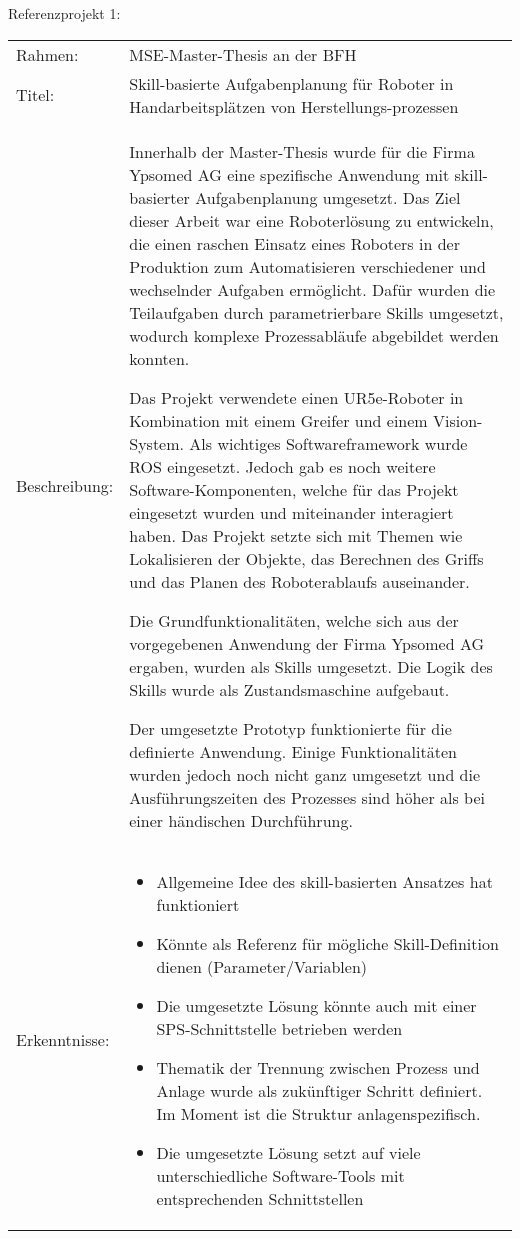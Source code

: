 	Referenzprojekt 1:
	\vspace{2mm}
	\\
	\begin{tabularx}{\textwidth}{@{}>{}p{8em} X@{}}
		Rahmen: & 
		MSE-Master-Thesis an der BFH
		\\
		
		Titel: & 
		Skill-basierte Aufgabenplanung für Roboter in Handarbeitsplätzen von Herstellungs-prozessen 
		\\
		
		Beschreibung: & 
		Innerhalb der Master-Thesis wurde für die Firma Ypsomed AG eine spezifische Anwendung mit skill-basierter Aufgabenplanung umgesetzt. Das Ziel dieser Arbeit war eine Roboterlösung zu entwickeln, die einen raschen Einsatz eines Roboters in der Produktion zum Automatisieren verschiedener und wechselnder Aufgaben ermöglicht. Dafür wurden die Teilaufgaben durch parametrierbare Skills umgesetzt, wodurch komplexe Prozessabläufe abgebildet werden konnten.
		
		Das Projekt verwendete einen UR5e-Roboter in Kombination mit einem Greifer und einem Vision-System. Als wichtiges Softwareframework wurde ROS eingesetzt. Jedoch gab es noch weitere Software-Komponenten, welche für das Projekt eingesetzt wurden und miteinander interagiert haben. Das Projekt setzte sich mit Themen wie Lokalisieren der Objekte, das Berechnen des Griffs und das Planen des Roboterablaufs auseinander.
		
		Die Grundfunktionalitäten, welche sich aus der vorgegebenen Anwendung der Firma Ypsomed AG ergaben, wurden als Skills umgesetzt. Die Logik des Skills wurde als Zustandsmaschine aufgebaut. 
		
		Der umgesetzte Prototyp funktionierte für die definierte Anwendung. Einige Funktionalitäten wurden jedoch noch nicht ganz umgesetzt und die Ausführungszeiten des Prozesses sind höher als bei einer händischen Durchführung. 
		\\
		
		Erkenntnisse: & 
		\begin{itemize}
			\item Allgemeine Idee des skill-basierten Ansatzes hat funktioniert
			\item Könnte als Referenz für mögliche Skill-Definition dienen (Parameter/Variablen)
			\item Die umgesetzte Lösung könnte auch mit einer SPS-Schnittstelle betrieben werden
			\item Thematik der Trennung zwischen Prozess und Anlage wurde als zukünftiger Schritt definiert. Im Moment ist die Struktur anlagenspezifisch.
			\item Die umgesetzte Lösung setzt auf viele unterschiedliche Software-Tools mit entsprechenden Schnittstellen
		\end{itemize}
	\end{tabularx}
	
